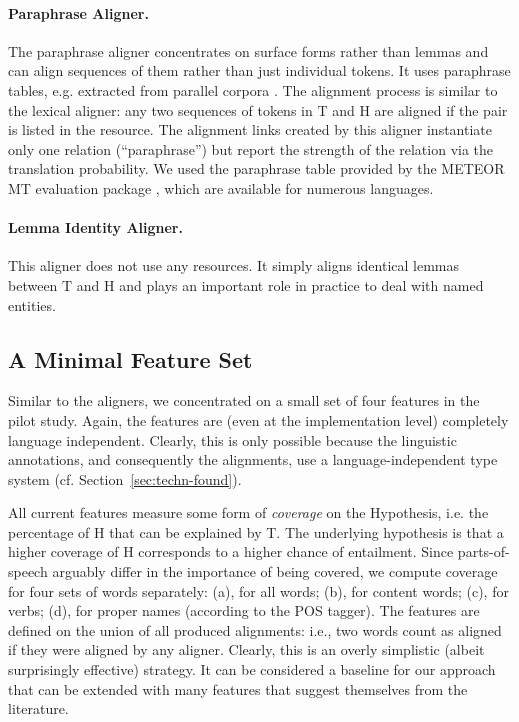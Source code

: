 \documentclass[11pt,letterpaper]{article}
\begin{document}
\paragraph{Paraphrase Aligner.} The paraphrase aligner concentrates on
surface forms rather than lemmas and can align sequences of them
rather than just individual tokens. It uses paraphrase tables, e.g.
extracted from parallel corpora
\cite{bannard05:_parap_bilin_paral_corpor}. The alignment process is
similar to the lexical aligner: any two sequences of tokens in T and H 
are aligned if the pair is listed in the resource.  The alignment
links created by this aligner instantiate only one relation
(``paraphrase'') but report the strength of the relation via the
translation probability. We used the paraphrase table provided by the
METEOR MT evaluation package \cite{denkowski-lavie:2014:W14-33}, which are available for numerous languages.

\paragraph{Lemma Identity Aligner.} This aligner does not use any
resources. It simply aligns identical lemmas between T and H and plays
an important role in practice to deal with named entities.

\subsection{A Minimal Feature Set} 

Similar to the aligners, we concentrated on a small set of four
features in the pilot study. Again, the features are (even at the
implementation level) completely language independent. Clearly, this
is only possible because the linguistic annotations, and consequently
the alignments, use a language-independent type system
(cf. Section~\ref{sec:techn-found}).

All current features measure some form of \textit{coverage} on the
Hypothesis, i.e. the percentage of H that can be explained by T. The
underlying hypothesis is that a higher coverage of H corresponds to a
higher chance of entailment. Since parts-of-speech arguably differ in
the importance of being covered, we compute coverage for four sets of
words separately: (a), for all words; (b), for content words; (c), for
verbs; (d), for proper names (according to the POS tagger). The
features are defined on the union of all produced alignments: i.e.,
two words count as aligned if they were aligned by any aligner. 
Clearly, this is an overly simplistic (albeit surprisingly effective)
strategy. It can be considered a baseline for our approach that can be
extended with many features that suggest themselves from the
literature. 
\end{document}
